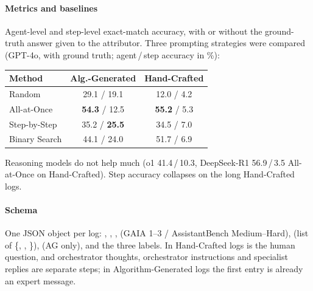 \paragraph{Metrics and baselines} Agent-level and step-level exact-match accuracy, with or without the ground-truth answer given to the attributor. Three prompting strategies were compared (GPT-4o, with ground truth; agent\,/\,step accuracy in \%):

\begin{center}\small
\begin{tabular}{@{}lcc@{}}\toprule
Method & Alg.-Generated & Hand-Crafted\\\midrule
Random & 29.1 / 19.1 & 12.0 / 4.2\\
All-at-Once & \textbf{54.3} / 12.5 & \textbf{55.2} / 5.3\\
Step-by-Step & 35.2 / \textbf{25.5} & 34.5 / 7.0\\
Binary Search & 44.1 / 24.0 & 51.7 / 6.9\\\bottomrule
\end{tabular}
\end{center}
Reasoning models do not help much (o1 41.4\,/\,10.3, DeepSeek-R1 56.9\,/\,3.5 All-at-Once on Hand-Crafted). Step accuracy collapses on the long Hand-Crafted logs.

\paragraph{Schema} One JSON object per log: , , ,  (GAIA 1--3 / AssistantBench Medium--Hard),  (list of \{, , \}),  (AG only), and the three labels. In Hand-Crafted logs  is the human question, and orchestrator thoughts, orchestrator instructions and specialist replies are separate steps; in Algorithm-Generated logs the first entry is already an expert message.

